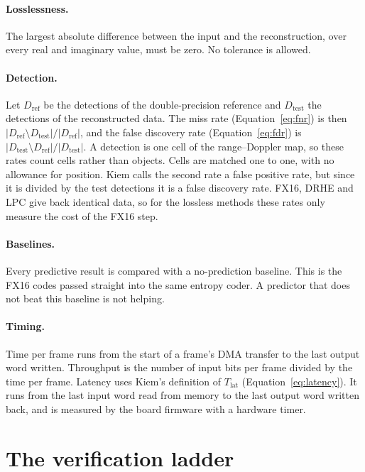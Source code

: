 \paragraph{Losslessness.} The largest absolute difference between the input
and the reconstruction, over every real and imaginary value, must be zero. No
tolerance is allowed.

\paragraph{Detection.}
\label{sec:detectionmetrics}
Let $D_{\mathrm{ref}}$ be the detections of the double-precision reference and
$D_{\mathrm{test}}$ the detections of the reconstructed data. The miss rate
(Equation~\eqref{eq:fnr}) is then $|D_{\mathrm{ref}} \setminus
D_{\mathrm{test}}| / |D_{\mathrm{ref}}|$, and the false discovery rate
(Equation~\eqref{eq:fdr}) is $|D_{\mathrm{test}} \setminus D_{\mathrm{ref}}| /
|D_{\mathrm{test}}|$. A detection is one cell of the range--Doppler map, so
these rates count cells rather than objects. Cells are matched one to one, with
no allowance for position. Kiem calls the second rate a false positive rate,
but since it is divided by the test detections it is a false discovery rate.
FX16, DRHE and LPC give back identical data, so for the lossless methods these
rates only measure the cost of the FX16 step.

\paragraph{Baselines.} Every predictive result is compared with a
no-prediction baseline. This is the FX16 codes passed straight into the same
entropy coder. A predictor that does not beat this baseline is not helping.

\paragraph{Timing.} Time per frame runs from the start of a frame's DMA
transfer to the last output word written. Throughput is the number of input
bits per frame divided by the time per frame. Latency uses Kiem's definition of
$T_{\text{lat}}$ (Equation~\eqref{eq:latency}). It runs from the last input
word read from memory to the last output word written back, and is measured by
the board firmware with a hardware timer.

\section{The verification ladder}
\label{sec:ladder}

